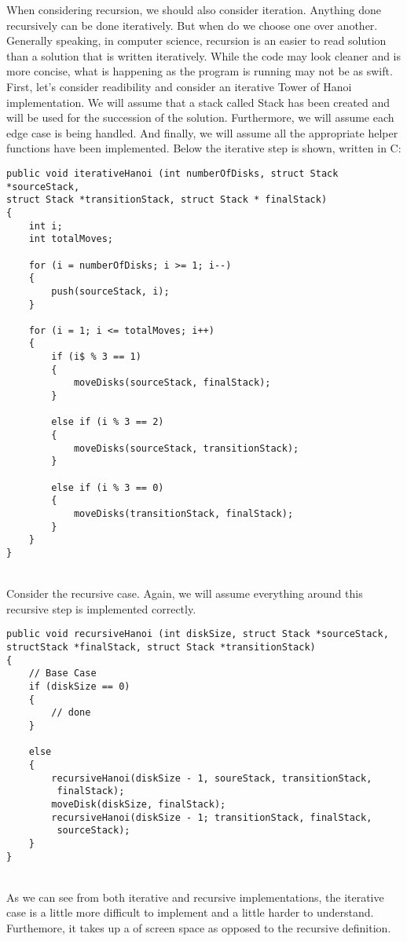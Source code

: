 \documentclass{article}
\begin{document}
When considering recursion, we should also consider iteration. Anything done recursively can be done iteratively. But when do we choose one over another. Generally speaking, in computer science, recursion is an easier to read solution than a solution that is written iteratively. While the code may look cleaner and is more concise, what is happening as the program is running may not be as swift. 
First, let's consider readibility and consider an iterative Tower of Hanoi implementation. We will assume that a stack called Stack has been created and will be used for the succession of the solution. Furthermore, we will assume each edge case is being handled. And finally, we will assume all the appropriate helper functions have been implemented. Below the iterative step is shown, written in C:
\\
\begin{lstlisting}
public void iterativeHanoi (int numberOfDisks, struct Stack *sourceStack, 
struct Stack *transitionStack, struct Stack * finalStack)
{
	int i;
	int totalMoves;
	
	for (i = numberOfDisks; i >= 1; i--)
	{
		push(sourceStack, i);
	}
	
	for (i = 1; i <= totalMoves; i++)
	{
		if (i$ % 3 == 1)
		{
			moveDisks(sourceStack, finalStack);
		}
		
		else if (i % 3 == 2)
		{
			moveDisks(sourceStack, transitionStack);
		}
		
		else if (i % 3 == 0)
		{
			moveDisks(transitionStack, finalStack);
		}
	}
}
\end{lstlisting}
~\\ Consider the recursive case. Again, we will assume everything around this recursive step is implemented correctly. 
\begin{lstlisting}
public void recursiveHanoi (int diskSize, struct Stack *sourceStack,   structStack *finalStack, struct Stack *transitionStack)
{
	// Base Case
	if (diskSize == 0)
	{
		// done
	}
	
	else 
	{
		recursiveHanoi(diskSize - 1, soureStack, transitionStack,
		 finalStack);
		moveDisk(diskSize, finalStack);
		recursiveHanoi(diskSize - 1; transitionStack, finalStack,
		 sourceStack);
	}
}
\end{lstlisting}
~\\As we can see from both iterative and recursive implementations, the iterative case is a little more difficult to implement and a little harder to understand. Furthemore, it takes up a of screen space as opposed to the recursive definition. 
~\\
\end{document}
